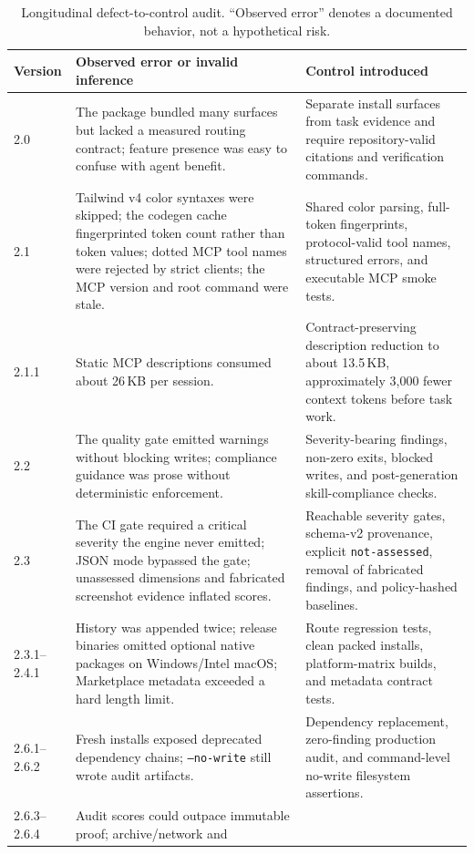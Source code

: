 \documentclass[10pt,twocolumn]{article}
\begin{document}
\begin{table}[t]
\centering
\caption{Longitudinal defect-to-control audit. ``Observed error'' denotes a
documented behavior, not a hypothetical risk.}
\label{tab:history}
\small
\begin{tabularx}{\textwidth}{@{}p{}p{}X@{}}
\toprule
Version & Observed error or invalid inference & Control introduced \\
\midrule
2.0 & The package bundled many surfaces but lacked a measured routing
contract; feature presence was easy to confuse with agent benefit. &
Separate install surfaces from task evidence and require repository-valid
citations and verification commands. \\
2.1 & Tailwind v4 color syntaxes were skipped; the codegen cache fingerprinted
token count rather than token values; dotted MCP tool names were rejected by
strict clients; the MCP version and root command were stale. &
Shared color parsing, full-token fingerprints, protocol-valid tool names,
structured errors, and executable MCP smoke tests. \\
2.1.1 & Static MCP descriptions consumed about 26\,KB per session. &
Contract-preserving description reduction to about 13.5\,KB, approximately
3,000 fewer context tokens before task work. \\
2.2 & The quality gate emitted warnings without blocking writes; compliance
guidance was prose without deterministic enforcement. &
Severity-bearing findings, non-zero exits, blocked writes, and post-generation
skill-compliance checks. \\
2.3 & The CI gate required a critical severity the engine never emitted; JSON
mode bypassed the gate; unassessed dimensions and fabricated screenshot
evidence inflated scores. &
Reachable severity gates, schema-v2 provenance, explicit
\texttt{not-assessed}, removal of fabricated findings, and policy-hashed
baselines. \\
2.3.1--2.4.1 & History was appended twice; release binaries omitted optional
native packages on Windows/Intel macOS; Marketplace metadata exceeded a hard
length limit. &
Route regression tests, clean packed installs, platform-matrix builds, and
metadata contract tests. \\
2.6.1--2.6.2 & Fresh installs exposed deprecated dependency chains;
\texttt{--no-write} still wrote audit artifacts. &
Dependency replacement, zero-finding production audit, and command-level
no-write filesystem assertions. \\
2.6.3--2.6.4 & Audit scores could outpace immutable proof; archive/network and

\end{tabularx}
\end{table}
\end{document}
